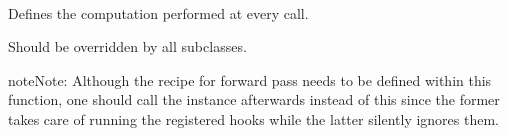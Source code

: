 \documentclass[letterpaper,10pt,english]{sphinxmanual}
\begin{document}
\begin{fulllineitems}
\label{\detokenize{pages/ml:vipercore.ml.models.GolgiCAE}}~

\begin{fulllineitems}
\label{\detokenize{pages/ml:vipercore.ml.models.GolgiCAE.forward}}
\sphinxAtStartPar
Defines the computation performed at every call.

\sphinxAtStartPar
Should be overridden by all subclasses.

\begin{sphinxadmonition}{note}{Note:}
\sphinxAtStartPar
Although the recipe for forward pass needs to be defined within
this function, one should call the  instance afterwards
instead of this since the former takes care of running the
registered hooks while the latter silently ignores them.
\end{sphinxadmonition}

\end{fulllineitems}


\end{fulllineitems}

\end{document}
